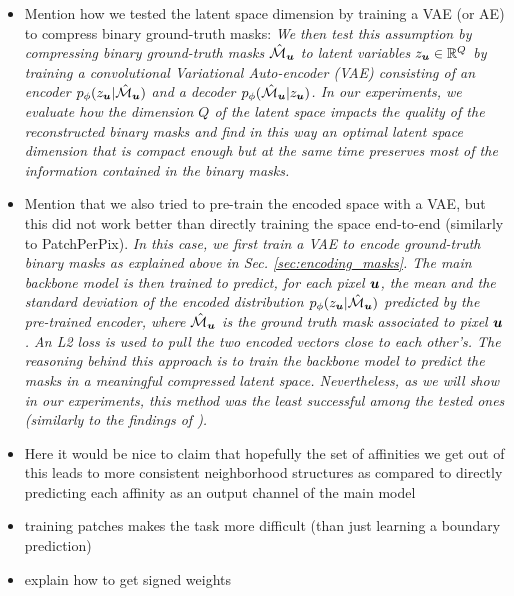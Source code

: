 \begin{itemize}
\item Mention how we tested the latent space dimension by training a VAE (or AE) to compress binary ground-truth \maskname masks: \emph{We then test this assumption by compressing binary ground-truth \maskname masks $\hat{\mathcal{M}}_{\bm{u}}$ to latent variables $z_{\bm{u}}\in \mathbb{R}^Q$ by training a convolutional Variational Auto-encoder (VAE) \cite{kingma2013auto,rezende2014stochastic} consisting of an encoder $p_{\phi}(z_{\bm{u}}|\hat{\mathcal{M}}_{\bm{u}})$ and a decoder $p_{\phi}(\hat{\mathcal{M}}_{\bm{u}}|z_{\bm{u}})$.
In our experiments, we evaluate how the dimension $Q$ of the latent space impacts the quality of the reconstructed binary masks and find in this way an optimal latent space dimension that is compact enough but at the same time preserves most of the information contained in the binary masks.}
\item Mention that we also tried to pre-train the encoded space with a VAE, but this did not work better than directly training the space end-to-end (similarly to PatchPerPix). 
\emph{In this case, we first train a VAE to encode ground-truth binary masks as explained above in Sec. \ref{sec:encoding_masks}. 
The main backbone model is then trained to predict, for each pixel $\bm{u}$, the mean and the standard deviation of the encoded distribution $p_{\phi}(z_{\bm{u}}|\hat{\mathcal{M}}_{\bm{u}})$ predicted by the pre-trained encoder, where $\hat{\mathcal{M}}_{\bm{u}}$ is the ground truth \maskname mask associated to pixel $\bm{u}$. An L2 loss is used to pull the two encoded vectors close to each other's. 
The reasoning behind this approach is to train the backbone model to predict the masks in a meaningful compressed latent space. 
Nevertheless, as we will show in our experiments, this method was the least successful among the tested ones (\emph{similarly to the findings of \cite{hirsch2020patchperpix}}).}
\item Here it would be nice to claim that hopefully the set of affinities we get out of this leads to more consistent neighborhood structures as compared to directly predicting each affinity as an output channel of the main model
\item training patches makes the task more difficult (than just learning a boundary prediction)
\item explain how to get signed weights

\end{itemize}


